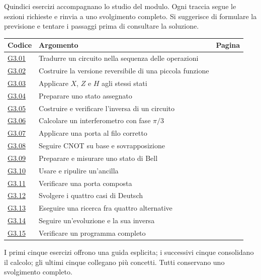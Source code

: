 \clearpage{}\label{exercise-index-3}
Quindici esercizi accompagnano lo studio del modulo. Ogni traccia segue le sezioni richieste e rinvia a uno svolgimento completo. Si suggerisce di formulare la previsione e tentare i passaggi prima di consultare la soluzione.
\begin{longtable}{@{}p{13mm}p{75mm}r@{}}\toprule Codice & Argomento & Pagina\\\midrule\endhead
\hyperref[ex-G3.01]{G3.01} & Tradurre un circuito nella sequenza delle operazioni & \pageref{ex-G3.01}\\[3pt]
\hyperref[ex-G3.02]{G3.02} & Costruire la versione reversibile di una piccola funzione & \pageref{ex-G3.02}\\[3pt]
\hyperref[ex-G3.03]{G3.03} & Applicare \(X\), \(Z\) e \(H\) agli stessi stati & \pageref{ex-G3.03}\\[3pt]
\hyperref[ex-G3.04]{G3.04} & Preparare uno stato assegnato & \pageref{ex-G3.04}\\[3pt]
\hyperref[ex-G3.05]{G3.05} & Costruire e verificare l'inversa di un circuito & \pageref{ex-G3.05}\\[3pt]
\hyperref[ex-G3.06]{G3.06} & Calcolare un interferometro con fase \(\pi /3\) & \pageref{ex-G3.06}\\[3pt]
\hyperref[ex-G3.07]{G3.07} & Applicare una porta al filo corretto & \pageref{ex-G3.07}\\[3pt]
\hyperref[ex-G3.08]{G3.08} & Seguire CNOT su base e sovrapposizione & \pageref{ex-G3.08}\\[3pt]
\hyperref[ex-G3.09]{G3.09} & Preparare e misurare uno stato di Bell & \pageref{ex-G3.09}\\[3pt]
\hyperref[ex-G3.10]{G3.10} & Usare e ripulire un'ancilla & \pageref{ex-G3.10}\\[3pt]
\hyperref[ex-G3.11]{G3.11} & Verificare una porta composta & \pageref{ex-G3.11}\\[3pt]
\hyperref[ex-G3.12]{G3.12} & Svolgere i quattro casi di Deutsch & \pageref{ex-G3.12}\\[3pt]
\hyperref[ex-G3.13]{G3.13} & Eseguire una ricerca fra quattro alternative & \pageref{ex-G3.13}\\[3pt]
\hyperref[ex-G3.14]{G3.14} & Seguire un'evoluzione e la sua inversa & \pageref{ex-G3.14}\\[3pt]
\hyperref[ex-G3.15]{G3.15} & Verificare un programma completo & \pageref{ex-G3.15}\\[3pt]
\bottomrule\end{longtable}
{\small I primi cinque esercizi offrono una guida esplicita; i successivi cinque consolidano il calcolo; gli ultimi cinque collegano più concetti. Tutti conservano uno svolgimento completo.}\par
